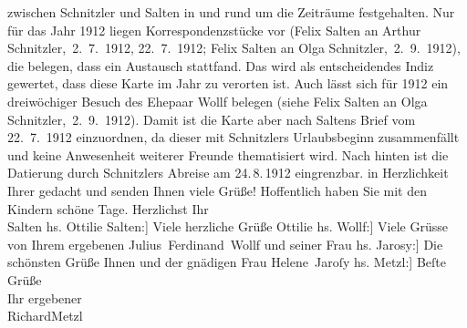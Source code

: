 \begin{ledgroupsized}[t]{13cm}
{{{                  zwischen Schnitzler und Salten in und rund um die Zeiträume festgehalten. Nur für
                  das Jahr 1912 liegen Korrespondenzstücke vor (Felix Salten an Arthur Schnitzler, 2. 7. 1912, 22. 7. 1912; Felix Salten an Olga Schnitzler, 2. 9. 1912), die belegen, dass ein Austausch
                  stattfand. Das wird als entscheidendes Indiz gewertet, dass diese Karte im Jahr zu verorten ist. Auch lässt sich für 1912
                  ein dreiwöchiger Besuch des Ehepaar
                     Wollf belegen (siehe Felix Salten an Olga Schnitzler, 2. 9. 1912). Damit ist die Karte aber nach Saltens
                  Brief vom 22. 7. 1912
                  einzuordnen, da dieser mit Schnitzlers
                  Urlaubsbeginn zusammenfällt und keine Anwesenheit weiterer Freunde thematisiert
                  wird. Nach hinten ist die Datierung durch Schnitzlers Abreise am 24. 8. 1912 eingrenzbar.}}}\label{K_L03575-1h} in Herzlichkeit
               Ihrer gedacht und senden Ihnen viele Grüße! Hoffentlich haben Sie mit den Kindern schöne Tage.
               Herzlichst Ihr {\\}\spacefill\mbox{Salten}\pend
           \pstart
           \noindent{}{[}hs. Ottilie Salten:{]} Viele herzliche Grüße \spacefill\mbox{Ottilie}\pend
           \pstart
           \noindent{}{[}hs. Wollf:{]} Viele Grüsse von Ihrem ergebenen\pend
           \pstart \spacefill\mbox{Julius Ferdinand Wollf} und seiner Frau\pend{}\pstart
           \noindent{}{[}hs. Jarosy:{]} Die schönsten Grüße Ihnen und der gnädigen Frau
                  \spacefill\mbox{Helene Jaroſy}\pend
           \pstart
           \noindent{}{[}hs. Metzl:{]} Beſte Grüße {\\}Ihr ergebener {\\}\spacefill\mbox{RichardMetzl}\pend
           

\end{ledgroupsized}
